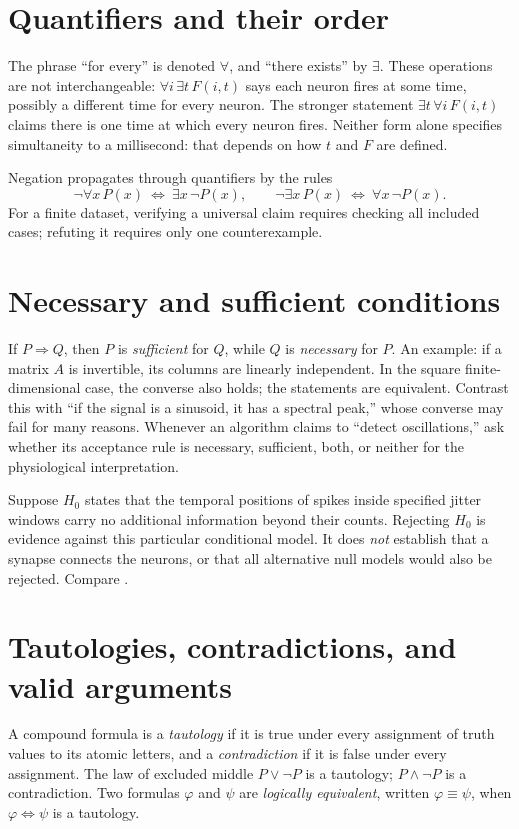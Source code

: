 \section{Quantifiers and their order}
The phrase ``for every'' is denoted $\forall$, and ``there exists'' by $\exists$. These operations are not interchangeable: $\forall i\,\exists t\,F(i,t)$ says each neuron fires at some time, possibly a different time for every neuron. The stronger statement $\exists t\,\forall i\,F(i,t)$ claims there is one time at which every neuron fires. Neither form alone specifies simultaneity to a millisecond: that depends on how $t$ and $F$ are defined.

Negation propagates through quantifiers by the rules
\[\neg\forall x\,P(x)\ \Leftrightarrow\ \exists x\,\neg P(x),\qquad
\neg\exists x\,P(x)\ \Leftrightarrow\ \forall x\,\neg P(x).\]
For a finite dataset, verifying a universal claim requires checking all included cases; refuting it requires only one counterexample.

\section{Necessary and sufficient conditions}
If $P\Rightarrow Q$, then $P$ is \emph{sufficient} for $Q$, while $Q$ is \emph{necessary} for $P$. An example: if a matrix $A$ is invertible, its columns are linearly independent. In the square finite-dimensional case, the converse also holds; the statements are equivalent. Contrast this with ``if the signal is a sinusoid, it has a spectral peak,'' whose converse may fail for many reasons. Whenever an algorithm claims to ``detect oscillations,'' ask whether its acceptance rule is necessary, sufficient, both, or neither for the physiological interpretation.



\begin{workedexample}
Suppose $H_0$ states that the temporal positions of spikes inside specified jitter windows carry no additional information beyond their counts. Rejecting $H_0$ is evidence against this particular conditional model. It does \emph{not} establish that a synapse connects the neurons, or that all alternative null models would also be rejected. Compare \cite{Amarasingham2012}.
\end{workedexample}
\section{Tautologies, contradictions, and valid arguments}
A compound formula is a \emph{tautology} if it is true under every assignment of truth values to its atomic letters, and a \emph{contradiction} if it is false under every assignment. The law of excluded middle $P\lor\neg P$ is a tautology; $P\land\neg P$ is a contradiction. Two formulas $\varphi$ and $\psi$ are \emph{logically equivalent}, written $\varphi\equiv\psi$, when $\varphi\Leftrightarrow\psi$ is a tautology.

